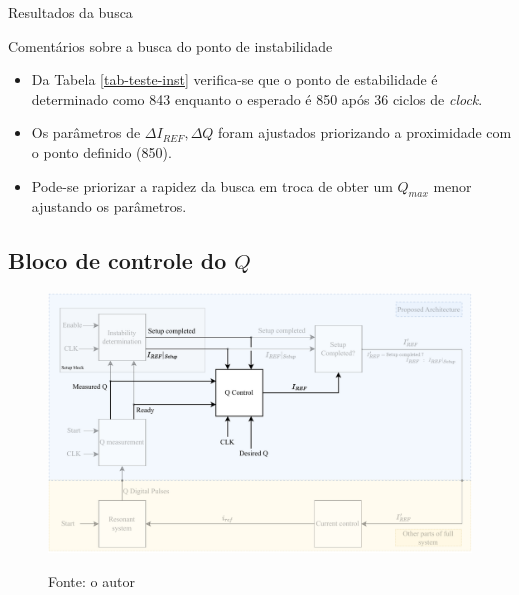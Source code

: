 \begin{frame}{Resultados da busca}

\begin{table}[H]
    \centering
    \caption{Resultados da busca por ponto máximo de estabilidade.}
    
    \label{tab-teste-inst}
     \caption*{Fonte: o autor}
\end{table}
    
\end{frame}

\begin{frame}{Comentários sobre a busca do ponto de instabilidade}

\begin{itemize}
    \item Da Tabela \autoref{tab-teste-inst} verifica-se que o ponto de estabilidade é determinado como 843 enquanto o esperado é 850 após 36 ciclos de \textit{clock}. 

    \item Os parâmetros de $\Delta I_{REF}, \Delta Q$ foram ajustados priorizando a proximidade com o ponto definido (850). 
    
    \item Pode-se priorizar a rapidez da busca em troca de obter um $Q_{max}$ menor ajustando os parâmetros.
\end{itemize}
    
\end{frame}

\subsection{Bloco de controle do $Q$}

\begin{frame}

\begin{figure}[H]
    \centering
    \caption{Destaque do DUT: $Q$ \textit{Control}}
    \includegraphics[width=.6\textwidth]{fig/destaque-q-control.pdf}
    \label{f-destaque-q-control}
    \caption*{Fonte: o autor}
\end{figure}
    
\end{frame}

